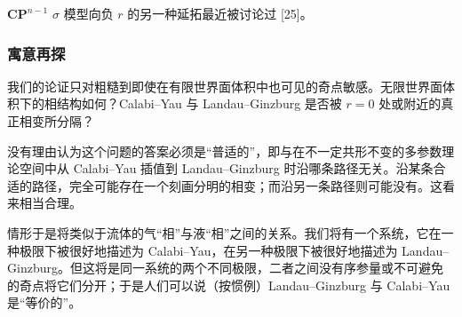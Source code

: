$\mathbf{CP}^{n-1}$ $\sigma$ 模型向负 $r$ 的另一种延拓最近被讨论过 [25]。

\subsubsection*{寓意再探}

我们的论证只对粗糙到即使在有限世界面体积中也可见的奇点敏感。无限世界面体积下的相结构如何？Calabi--Yau 与 Landau--Ginzburg 是否被 $r=0$ 处或附近的真正相变所分隔？

没有理由认为这个问题的答案必须是“普适的”，即与在不一定共形不变的多参数理论空间中从 Calabi--Yau 插值到 Landau--Ginzburg 时沿哪条路径无关。沿某条合适的路径，完全可能存在一个刻画分明的相变；而沿另一条路径则可能没有。这看来相当合理。

情形于是将类似于流体的气“相”与液“相”之间的关系。我们将有一个系统，它在一种极限下被很好地描述为 Calabi--Yau，在另一种极限下被很好地描述为 Landau--Ginzburg。但这将是同一系统的两个不同极限，二者之间没有序参量或不可避免的奇点将它们分开；于是人们可以说（按惯例）Landau--Ginzburg 与 Calabi--Yau 是“等价的”。
